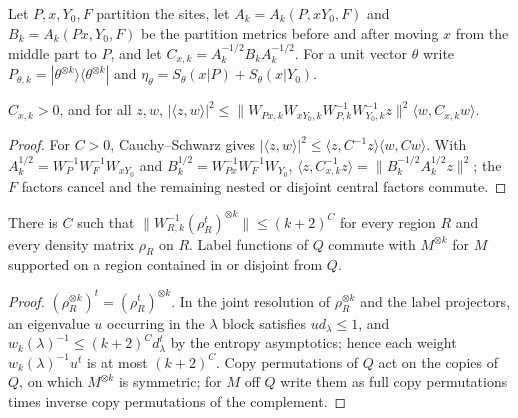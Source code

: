 Let $P,x,Y_0,F$ partition the sites, let $A_k=A_k(P,xY_0,F)$ and $B_k=A_k(Px,Y_0,F)$ be the
partition metrics before and after moving $x$ from the middle part to $P$, and let
$C_{x,k}=A_k^{-1/2}B_kA_k^{-1/2}$. For a unit vector $\theta$ write
$P_{\theta,k}=|\theta^{\otimes k}\rangle\langle\theta^{\otimes k}|$ and
$\eta_\theta=S_\theta(x|P)+S_\theta(x|Y_0)$.

\begin{lemma}
    \label{lem:move_inverse}
    \leanok
    $C_{x,k}>0$, and for all $z,w$,
    $|\langle z,w\rangle|^2\le\|W_{Px,k}W_{xY_0,k}W_{P,k}^{-1}W_{Y_0,k}^{-1}z\|^2
    \langle w,C_{x,k}w\rangle$.
\end{lemma}

\begin{proof}\leanok
    For $C>0$, Cauchy--Schwarz gives $|\langle z,w\rangle|^2\le\langle z,C^{-1}z\rangle
    \langle w,Cw\rangle$. With $A_k^{1/2}=W_P^{-1}W_F^{-1}W_{xY_0}$ and
    $B_k^{1/2}=W_{Px}^{-1}W_F^{-1}W_{Y_0}$,
    $\langle z,C_{x,k}^{-1}z\rangle=\|B_k^{-1/2}A_k^{1/2}z\|^2$; the $F$ factors cancel and the
    remaining nested or disjoint central factors commute.
\end{proof}

\begin{lemma}
    \label{lem:compensator}
    \leanok
    There is $C$ such that $\|W_{R,k}^{-1}(\rho_R^t)^{\otimes k}\|\le(k+2)^C$ for every
    region $R$ and every density matrix $\rho_R$ on $R$. Label functions of $Q$ commute with
    $M^{\otimes k}$ for $M$ supported on a region contained in or disjoint from $Q$.
\end{lemma}

\begin{proof}\leanok
    $(\rho_R^{\otimes k})^t=(\rho_R^t)^{\otimes k}$. In the joint resolution of
    $\rho_R^{\otimes k}$ and the label projectors, an eigenvalue $u$ occurring in the
    $\lambda$ block satisfies $ud_\lambda\le1$, and $w_k(\lambda)^{-1}\le(k+2)^Cd_\lambda^t$ by
    the entropy asymptotics; hence each weight $w_k(\lambda)^{-1}u^t$ is at most $(k+2)^C$.
    Copy permutations of $Q$ act on the copies of $Q$, on which $M^{\otimes k}$ is symmetric;
    for $M$ off $Q$ write them as full copy permutations times inverse copy permutations of
    the complement.
\end{proof}

